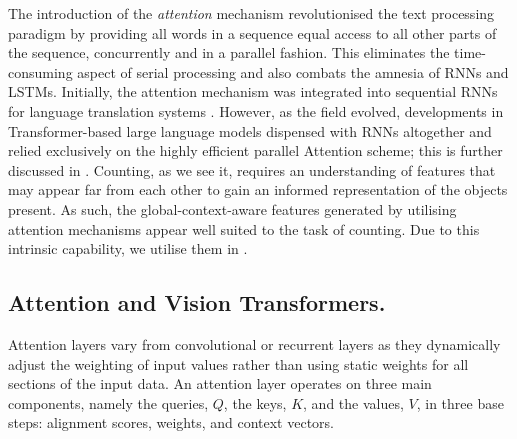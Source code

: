 \documentclass[../thesis.tex]{subfiles}
\begin{document}
The introduction of the \textit{attention} mechanism revolutionised the text processing paradigm by providing all words in a sequence equal access to all other parts of the sequence, concurrently and in a parallel fashion. 
This eliminates the time-consuming aspect of serial processing and also combats the amnesia of RNNs and LSTMs. Initially, the attention mechanism was integrated into sequential RNNs for language translation systems \cite{bahdanau2016neural}. However, as the field evolved, developments in Transformer-based large language models dispensed with RNNs altogether and relied exclusively on the highly efficient parallel Attention scheme; 
this is further discussed in .
Counting, as we see it, requires an understanding of features that may appear far from each other to gain an informed representation of the objects present.
As such, the global-context-aware features generated by utilising attention mechanisms appear well suited to the task of counting. Due to this intrinsic capability, we utilise them in .




\subsection{Attention and Vision Transformers.}\label{LTCA__sec__lit_rev__transformers}
Attention layers vary from convolutional or recurrent layers as they dynamically adjust the weighting of input values rather than using static weights for all sections of the input data. 
An attention layer operates on three main components, namely the queries, $Q$, the keys, $K$, and the values, $V$, in three base steps: alignment scores, weights, and context vectors.
\end{document}
